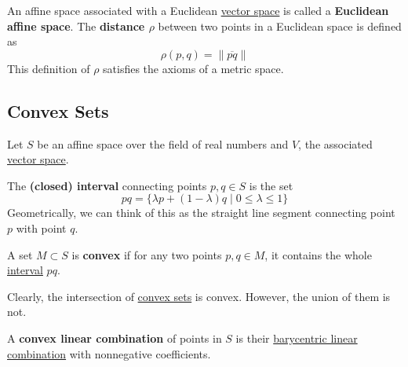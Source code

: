   \begin{definition}
    \label{def:euclidean-affine-space}
    An affine space associated with a Euclidean \hyperref[def:vector-space]{vector space} is called a \textbf{Euclidean affine space}. The \textbf{distance $\rho$} between two points in a Euclidean space is defined as
    \begin{equation}
      \rho(p, q) = \|\overline{pq}\|
    \end{equation}
    This definition of $\rho$ satisfies the axioms of a metric space. 
  \end{definition}

\subsection{Convex Sets}

  Let $S$ be an affine space over the field of real numbers and $V$, the associated \hyperref[def:vector-space]{vector space}. 

  \begin{definition}
    \label{def:closed-interval-between-two-points}
    The \textbf{(closed) interval} connecting points $p, q \in S$ is the set
    \begin{equation}
      pq = \{\lambda p + (1-\lambda) q \;|\; 0 \leq \lambda \leq 1\}
    \end{equation}
    Geometrically, we can think of this as the straight line segment connecting point $p$ with point $q$. 
  \end{definition}

  \begin{definition}
    \label{def:convex-set}
    A set $M \subset S$ is \textbf{convex} if for any two points $p, q \in M$, it contains the whole \hyperref[def:closed-interval-between-two-points]{interval} $pq$. 
  \end{definition}

  Clearly, the intersection of \hyperref[st-def:convex-sets]{convex sets} is convex. However, the union of them is not. 

  \begin{definition}
    \label{def:convex-linear-combination}
    A \textbf{convex linear combination} of points in $S$ is their \hyperref[def:barycentric-linear-combination]{barycentric linear combination} with nonnegative coefficients. 
  \end{definition}

